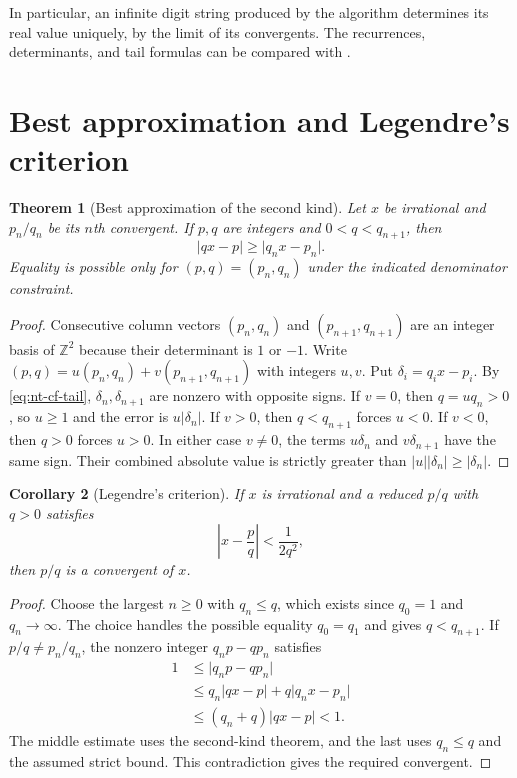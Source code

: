 \documentclass[11pt,oneside,openany]{book}
\theoremstyle{plain}
\newtheorem{theorem}{Theorem}[chapter]
\newtheorem{corollary}[theorem]{Corollary}
\theoremstyle{definition}
\theoremstyle{remark}
\begin{document}
In particular, an infinite digit string produced by the algorithm
determines its real value uniquely, by the limit of its convergents.
The recurrences, determinants, and tail formulas can be compared with
\cite[\S\S7.2--7.4, Theorems 7.4, 7.5, and 7.11]{nzm}.

\section{Best approximation and Legendre's criterion}
\label{nt:E04}

\begin{theorem}[Best approximation of the second kind]
Let \(x\) be irrational and \(p_n/q_n\) be its \(n\)th convergent. If
\(p,q\) are integers and \(0<q<q_{n+1}\), then
\[
 \lvert qx-p\rvert\ge \lvert q_nx-p_n\rvert.
\]
Equality is possible only for \((p,q)=(p_n,q_n)\) under the indicated
denominator constraint.
\end{theorem}
\begin{proof}
Consecutive column vectors \((p_n,q_n)\) and \((p_{n+1},q_{n+1})\)
are an integer basis of \(\mathbb Z^2\) because their determinant is
\(1\) or \(-1\). Write
\((p,q)=u(p_n,q_n)+v(p_{n+1},q_{n+1})\) with integers \(u,v\).
Put \(\delta_i=q_ix-p_i\). By \eqref{eq:nt-cf-tail},
\(\delta_n,\delta_{n+1}\) are nonzero with opposite signs.
If \(v=0\), then \(q=uq_n>0\), so \(u\ge1\) and the error is
\(u\lvert\delta_n\rvert\).
If \(v>0\), then \(q<q_{n+1}\) forces \(u<0\). If \(v<0\), then
\(q>0\) forces \(u>0\). In either case \(v\ne0\), the terms
\(u\delta_n\) and \(v\delta_{n+1}\) have the same sign. Their combined
absolute value is strictly greater than
\(\lvert u\rvert\lvert\delta_n\rvert\ge\lvert\delta_n\rvert\).
\end{proof}

\begin{corollary}[Legendre's criterion]
\label{cor:nt-legendre}
If \(x\) is irrational and a reduced \(p/q\) with \(q>0\) satisfies
\[
 \left|x-\frac pq\right|<\frac{1}{2q^2},
\]
then \(p/q\) is a convergent of \(x\).
\end{corollary}
\begin{proof}
Choose the largest \(n\ge0\) with \(q_n\le q\), which exists since
\(q_0=1\) and \(q_n\to\infty\). The choice handles the possible equality
\(q_0=q_1\) and gives \(q<q_{n+1}\). If \(p/q\ne p_n/q_n\), the
nonzero integer \(q_np-qp_n\) satisfies
\[
 \begin{aligned}
 1
 &\le \lvert q_np-qp_n\rvert\\
 &\le q_n\lvert qx-p\rvert+q\lvert q_nx-p_n\rvert\\
 &\le (q_n+q)\lvert qx-p\rvert<1.
 \end{aligned}
\]
The middle estimate uses the second-kind theorem, and the last uses
\(q_n\le q\) and the assumed strict bound. This contradiction gives the
required convergent.
\end{proof}
\end{document}
